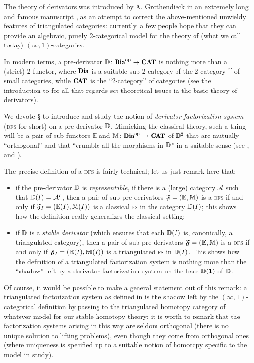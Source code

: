 The theory of derivators was introduced by A\@. Grothendieck in an extremely long and famous manuscript \cite{tendieckderiv}, as an attempt to correct the above\hyp{}mentioned unwieldy features of triangulated categories: currently, a few people hope that they can provide an algebraic, purely 2-categorical model for the theory of (what we call today) $(\infty,1)$\hyp{}categories.

In modern terms, a pre-derivator $\D\colon \Dia^\opp\to\Cat$ is nothing more than a (strict) 2-functor, where $\Dia$ is a suitable sub\hyp{}2\hyp{}category of the 2-category $\cat$ of small categories, while $\Cat$ is the ``2-category'' of categories (see the introduction to \cite{Moritz} for all that regards set-theoretical issues in the basic theory of derivators).

We devote § to introduce and study the notion of \emph{derivator factorization system} (\textsc{dfs} for short) on a pre-derivator $\mathbb{D}$. Mimicking the classical theory, such a thing will be a pair of sub-functors $\mathbb E$ and $\mathbb M\colon \Dia^\opp\to\Cat$ of $\D^\due$ that are mutually ``orthogonal'' and that ``crumble all the morphisms in $\mathbb{D}$'' in a suitable sense (see \adef{},  and ).

The precise definition of a \textsc{dfs} is fairly technical; let us just remark here that:
\begin{itemize}
\item if the pre-derivator $\mathbb{D}$ is \emph{representable}, \ie if there is a (large) category $\mathcal{A}$ such that $\mathbb{D}(I)=\mathcal{A}^I$, then a pair of sub pre-derivators $\mathfrak{F}=(\mathbb E,\mathbb M)$ is a \textsc{dfs} if and only if $\mathfrak{F}_I=(\mathbb E(I),\mathbb M(I))$ is a classical \textsc{fs} in the category $\mathbb{D}(I)$; this shows how the definition really generalizes the classical setting;
\item if $\mathbb{D}$ is a \emph{stable derivator} (which ensures that each $\mathbb{D}(I)$ is, canonically, a triangulated category), then a pair of sub pre-derivators $\mathfrak{F}=(\mathbb E,\mathbb M)$ is a \textsc{dfs} if and only if $\mathfrak{F}_I=(\mathbb E(I),\mathbb M(I))$ is a triangulated \textsc{fs} in $\mathbb{D}(I)$. This shows how the definition of a triangulated factorization system is nothing more than the ``shadow'' left by a derivator factorization system on the base $\D(\uno)$ of $\mathbb{D}$.
\end{itemize}
Of course, it would be possible to make a general statement out of this remark: a triangulated factorization system as defined in  is the shadow left by the $(\infty,1)$\hyp{}categorical definition by passing to the triangulated homotopy category of whatever model for our stable homotopy theory: it is worth to remark that the factorization systems arising in this way are seldom orthogonal (\ie there is no unique solution to lifting problems), even though they come from orthogonal ones (where uniqueness is specified up to a suitable notion of homotopy specific to the model in study).


